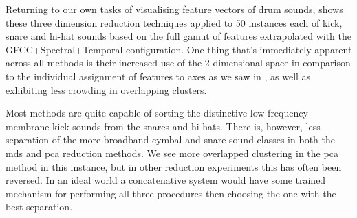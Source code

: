 Returning to our own tasks of visualising feature vectors of drum sounds,  shows these three dimension reduction techniques applied to 50 instances each of kick, snare and hi-hat sounds based on the full gamut of features extrapolated with the GFCC+Spectral+Temporal configuration. One thing that's immediately apparent across all methods is their increased use of the 2-dimensional space in comparison to the individual assignment of features to axes as we saw in , as well as exhibiting less crowding in overlapping clusters.

Most methods are quite capable of sorting the distinctive low frequency membrane kick sounds from the snares and hi-hats. There is, however, less separation of the more broadband cymbal and snare sound classes in both the \acrshort{mds} and \acrshort{pca} reduction methods. We see more overlapped clustering in the \acrshort{pca} method in this instance, but in other reduction experiments this has often been reversed. In an ideal world a concatenative system would have some trained mechanism for performing all three procedures then choosing the one with the best separation.

